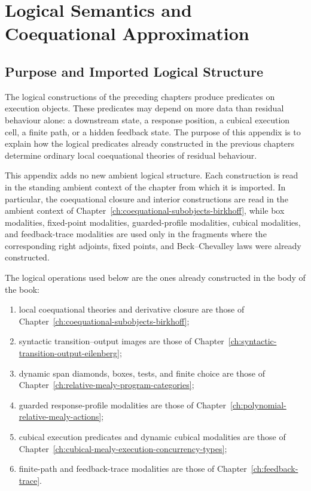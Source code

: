 
\chapter{Logical Semantics and Coequational Approximation}
\label{ch:logical-semantics-coequational-approximation}

\section{Purpose and Imported Logical Structure}
\label{sec:logical-semantics-standing-framework}

The logical constructions of the preceding chapters produce predicates on
execution objects.  These predicates may depend on more data than residual
behaviour alone: a downstream state, a response position, a cubical execution
cell, a finite path, or a hidden feedback state.  The purpose of this
appendix is to explain how the logical predicates already constructed in the
previous chapters determine ordinary local coequational theories of residual
behaviour.

This appendix adds no new ambient logical structure.  Each construction is
read in the standing ambient context of the chapter from which it is imported.
In particular, the coequational closure and interior constructions are read
in the ambient context of
Chapter~\ref{ch:coequational-subobjects-birkhoff}, while box modalities,
fixed-point modalities, guarded-profile modalities, cubical modalities, and
feedback-trace modalities are used only in the fragments where the
corresponding right adjoints, fixed points, and Beck--Chevalley laws were
already constructed.

The logical operations used below are the ones already constructed in the
body of the book:

\begin{enumerate}
  \item local coequational theories and derivative closure are those of
  Chapter~\ref{ch:coequational-subobjects-birkhoff};

  \item syntactic transition--output images are those of
  Chapter~\ref{ch:syntactic-transition-output-eilenberg};

  \item dynamic span diamonds, boxes, tests, and finite choice are those of
  Chapter~\ref{ch:relative-mealy-program-categories};

  \item guarded response-profile modalities are those of
  Chapter~\ref{ch:polynomial-relative-mealy-actions};

  \item cubical execution predicates and dynamic cubical modalities are those
  of Chapter~\ref{ch:cubical-mealy-execution-concurrency-types};

  \item finite-path and feedback-trace modalities are those of
  Chapter~\ref{ch:feedback-trace}.
\end{enumerate}


